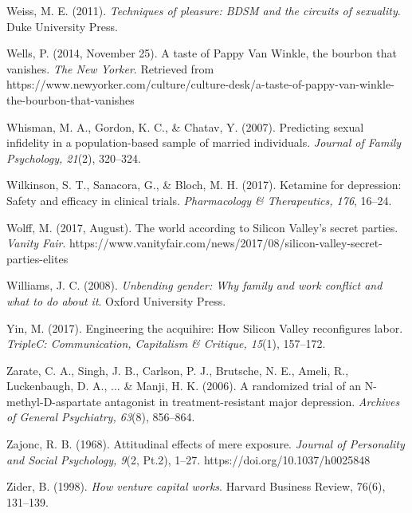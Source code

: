 \begin{thebibliography}{}
    Weiss, M. E. (2011). \textit{Techniques of pleasure: BDSM and the circuits of sexuality}. Duke University Press.

    Wells, P. (2014, November 25). A taste of Pappy Van Winkle, the bourbon that vanishes. \textit{The New Yorker}. Retrieved from https://www.newyorker.com/culture/culture-desk/a-taste-of-pappy-van-winkle-the-bourbon-that-vanishes

    Whisman, M. A., Gordon, K. C., \& Chatav, Y. (2007). Predicting sexual infidelity in a population-based sample of married individuals. \textit{Journal of Family Psychology, 21}(2), 320–324.

    Wilkinson, S. T., Sanacora, G., \& Bloch, M. H. (2017). Ketamine for depression: Safety and efficacy in clinical trials. \textit{Pharmacology \& Therapeutics, 176}, 16–24.

    Wolff, M. (2017, August). The world according to Silicon Valley’s secret parties. \textit{Vanity Fair}. https://www.vanityfair.com/news/2017/08/silicon-valley-secret-parties-elites
    
    Williams, J. C. (2008). \textit{Unbending gender: Why family and work conflict and what to do about it}. Oxford University Press.



    Yin, M. (2017). Engineering the acquihire: How Silicon Valley reconfigures labor. \textit{TripleC: Communication, Capitalism \& Critique, 15}(1), 157–172.


    Zarate, C. A., Singh, J. B., Carlson, P. J., Brutsche, N. E., Ameli, R., Luckenbaugh, D. A., ... \& Manji, H. K. (2006). A randomized trial of an N-methyl-D-aspartate antagonist in treatment-resistant major depression. \textit{Archives of General Psychiatry, 63}(8), 856–864.

    Zajonc, R. B. (1968). Attitudinal effects of mere exposure. \textit{Journal of Personality and Social Psychology, 9}(2, Pt.2), 1--27. https://doi.org/10.1037/h0025848

    Zider, B. (1998). \textit{How venture capital works}. Harvard Business Review, 76(6), 131–139.


\end{thebibliography}
